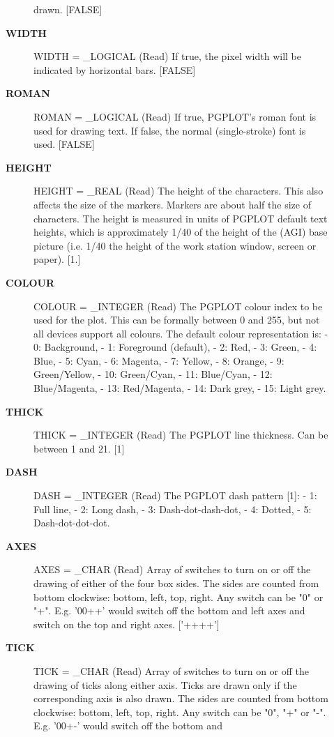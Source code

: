 \begin{description}
\begin{description}
   drawn. [FALSE]
\item [\textbf{WIDTH}]
WIDTH = \_LOGICAL (Read)
   If true, the pixel width will be indicated by horizontal bars.
   [FALSE]
\item [\textbf{ROMAN}]
ROMAN = \_LOGICAL (Read)
   If true, PGPLOT's roman font is used for drawing text. If
   false, the normal (single-stroke) font is used. [FALSE]
\item [\textbf{HEIGHT}]
HEIGHT = \_REAL (Read)
   The height of the characters. This also affects the size of the
   markers. Markers are about half the size of characters. The
   height is measured in units of PGPLOT default text heights,
   which is approximately 1/40 of the height of the (AGI) base
   picture (i.e. 1/40 the height of the work station window, screen
   or paper). [1.]
\item [\textbf{COLOUR}]
COLOUR = \_INTEGER (Read)
   The PGPLOT colour index to be used for the plot. This can be
   formally between 0 and 255, but not all devices support all
   colours. The default colour representation is:
   -  0: Background,           -  1: Foreground (default),
   -  2: Red,                  -  3: Green,
   -  4: Blue,                 -  5: Cyan,
   -  6: Magenta,              -  7: Yellow,
   -  8: Orange,               -  9: Green/Yellow,
   - 10: Green/Cyan,           - 11: Blue/Cyan,
   - 12: Blue/Magenta,         - 13: Red/Magenta,
   - 14: Dark grey,            - 15: Light grey.
\item [\textbf{THICK}]
THICK = \_INTEGER (Read)
   The PGPLOT line thickness. Can be between 1 and 21. [1]
\item [\textbf{DASH}]
DASH = \_INTEGER (Read)
   The PGPLOT dash pattern [1]:
   -  1: Full line,
   -  2: Long dash,
   -  3: Dash-dot-dash-dot,
   -  4: Dotted,
   -  5: Dash-dot-dot-dot.
\item [\textbf{AXES}]
AXES = \_CHAR (Read)
   Array of switches to turn on or off the drawing of either of
   the four box sides. The sides are counted from bottom
   clockwise: bottom, left, top, right. Any switch can be
   "0" or "+". E.g. '00++' would switch off the bottom and left
   axes and switch on the top and right axes. ['++++']
\item [\textbf{TICK}]
TICK = \_CHAR (Read)
   Array of switches to turn on or off the drawing of ticks along
   either axis. Ticks are drawn only if the corresponding axis is
   also drawn. The sides are counted from bottom
   clockwise: bottom, left, top, right. Any switch can be
   "0", "+" or "-". E.g. '00+-' would switch off the bottom and

\end{description}
\end{description}
